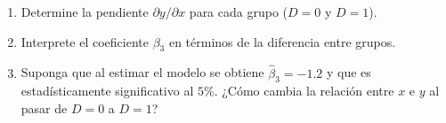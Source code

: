 \documentclass[10pt,a4paper]{article}
\begin{document}
\begin{enumerate}
\begin{enumerate}
  \item[(a)] Determine la pendiente $\partial y / \partial x$ para cada grupo ($D=0$ y $D=1$).
  \item[(b)] Interprete el coeficiente $\beta_3$ en términos de la diferencia entre grupos.
  \item[(c)] Suponga que al estimar el modelo se obtiene $\widehat{\beta}_3=-1.2$ y que es estadísticamente significativo al $5\%$.  
        ¿Cómo cambia la relación entre $x$ e $y$ al pasar de $D=0$ a $D=1$?
\end{enumerate}


\end{enumerate}






    
\end{document}
